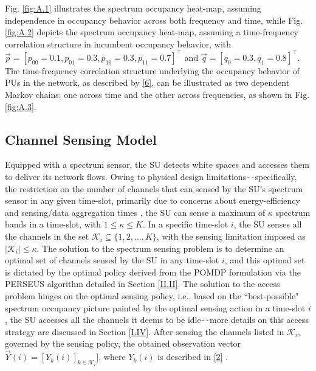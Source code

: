 \documentclass[12pt, draftcls, onecolumn]{IEEEtran}
\begin{document}
Fig. \ref{fig:A.1} illustrates the spectrum occupancy heat-map, assuming independence in occupancy behavior across both frequency and time, while Fig. \ref{fig:A.2} depicts the spectrum occupancy heat-map, assuming a time-frequency correlation structure in incumbent occupancy behavior, with $\vec{p}{=}[p_{00}{=}0.1,p_{01}{=}0.3,p_{10}{=}0.3,p_{11}{=}0.7]^{\intercal}$ and $\vec{q}=[q_{0}{=}0.3,q_{1}{=}0.8]^{\intercal}$. The time-frequency correlation structure underlying the occupancy behavior of PUs in the network, as described by \eqref{6}, can be illustrated as two dependent Markov chains: one across time and the other across frequencies, as shown in Fig. \ref{fig:A.3}.
\subsection{Channel Sensing Model}\label{I.III}
Equipped with a spectrum sensor, the SU detects white spaces and accesses them to deliver its network flows. Owing to physical design limitations\texttt{-{}-}specifically, the restriction on the number of channels that can sensed by the SU's spectrum sensor in any given time-slot, primarily due to concerns about energy-efficiency and sensing/data aggregation times \cite{WCL:3}, the SU can sense a maximum of $\kappa$ spectrum bands in a time-slot, with $1{\leq}\kappa{\leq}K$. In a specific time-slot $i$, the SU senses all the channels in the set $\mathcal{K}_{i}{\subseteq}\{1,2,\dots,K\}$, with the sensing limitation imposed as $|\mathcal{K}_{i}|{\leq}\kappa$. The solution to the spectrum sensing problem is to determine an optimal set of channels sensed by the SU in any time-slot $i$, and this optimal set is dictated by the optimal policy derived from the POMDP formulation via the PERSEUS algorithm detailed in Section \ref{II.II}. The solution to the access problem hinges on the optimal sensing policy, i.e., based on the ``best-possible" spectrum occupancy picture painted by the optimal sensing action in a time-slot $i$, the SU accesses all the channels it deems to be idle\texttt{-{}-}more details on this access strategy are discussed in Section \ref{I.IV}. After sensing the channels listed in $\mathcal{K}_{i}$, governed by the sensing policy, the obtained observation vector $\vec{Y}(i){=}[Y_{k}(i)]_{k{\in}\mathcal{K}_{i}}]$, where $Y_{k}(i)$ is described in \eqref{2} \cite{WCL:paper}.
\end{document}
